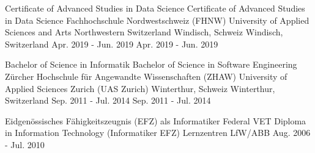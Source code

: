 {
}

\begin{cventries}

  	\cventry
  	{
  			{ Certificate of Advanced Studies in Data Science }
  			{ Certificate of Advanced Studies in Data Science }
  	} %
  	{
  			{ Fachhochschule Nordwestschweiz (FHNW) }
  			{ University of Applied Sciences and Arts Northwestern Switzerland }
  	} %
  	{
  			{ Windisch, Schweiz }
  			{ Windisch, Switzerland }
  	} %
  	{
  			{ Apr. 2019 - Jun. 2019 }
  			{ Apr. 2019 - Jun. 2019 }
  	} %
  	{
  	}
  
  	\cventry
    {
    		{ Bachelor of Science in Informatik }
    		{ Bachelor of Science in Software Engineering }
    } %
    {
    		{ Zürcher Hochschule für Angewandte Wissenschaften (ZHAW) }
    		{ University of Applied Sciences Zurich (UAS Zurich) }
    } %
    {
    		{ Winterthur, Schweiz }
    		{ Winterthur, Switzerland }
    } %
    {
     		{ Sep. 2011 - Jul. 2014 }
    		{ Sep. 2011 - Jul. 2014 }
    } %
    {
    }

	\cventry
	{
			{Eidgenössisches Fähigkeitszeugnis (EFZ) als Informatiker}
			{Federal VET Diploma in Information Technology (Informatiker EFZ)}
	} %
	{Lernzentren LfW/ABB} %
	{
	} %
	{Aug. 2006 - Jul. 2010} %
	{
	}

\end{cventries}
